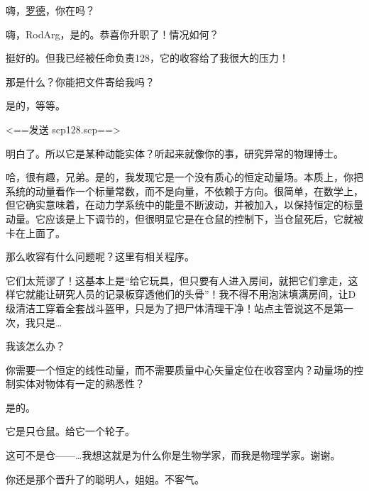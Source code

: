 

\begin{scpbox}

 嗨，\hyperref[chap:SCP-2289]{罗德}，你在吗？

 嗨，RodArg，是的。恭喜你升职了！情况如何？

 挺好的。但我已经被任命负责128，它的收容给了我很大的压力！

 那是什么？你能把文件寄给我吗？

 是的，等等。

<==发送 scp128.scp==>

 明白了。所以它是某种动能实体？听起来就像你的事，研究异常的物理博士。

 哈，很有趣，兄弟。是的，我发现它是一个没有质心的恒定动量场。本质上，你把系统的动量看作一个标量常数，而不是向量，不依赖于方向。很简单，在数学上，但它确实意味着，在动力学系统中的能量不断波动，并被加入，以保持恒定的标量动量。它应该是上下调节的，但很明显它是在仓鼠的控制下，当仓鼠死后，它就被卡在上面了。

 那么收容有什么问题呢？这里有相关程序。

 它们太荒谬了！这基本上是“给它玩具，但只要有人进入房间，就把它们拿走，这样它就能让研究人员的记录板穿透他们的头骨”！我不得不用泡沫填满房间，让D级清洁工穿着全套战斗盔甲，只是为了把尸体清理干净！站点主管说这不是第一次，我只是…

 我该怎么办？

 你需要一个恒定的线性动量，而不需要质量中心矢量定位在收容室内？动量场的控制实体对物体有一定的熟悉性？

 是的。

 它是只仓鼠。给它一个轮子。

 这可不是仓——…我想这就是为什么你是生物学家，而我是物理学家。谢谢。

 你还是那个晋升了的聪明人，姐姐。不客气。

\end{scpbox}
